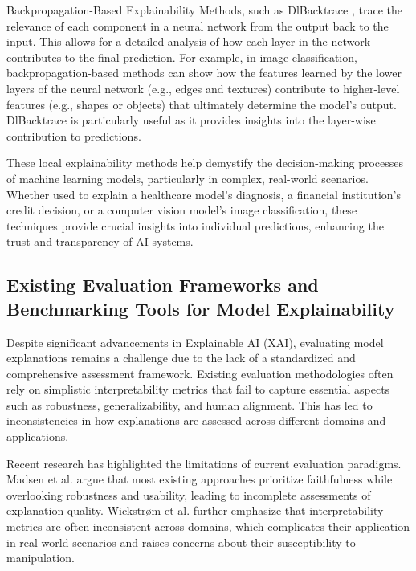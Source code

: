 Backpropagation-Based Explainability Methods, such as DlBacktrace \cite{sankarapu2024DlBacktracemodelagnosticexplainability}, trace the relevance of each component in a neural network from the output back to the input. This allows for a detailed analysis of how each layer in the network contributes to the final prediction. For example, in image classification, backpropagation-based methods can show how the features learned by the lower layers of the neural network (e.g., edges and textures) contribute to higher-level features (e.g., shapes or objects) that ultimately determine the model’s output. DlBacktrace is particularly useful as it provides insights into the layer-wise contribution to predictions.

These local explainability methods help demystify the decision-making processes of machine learning models, particularly in complex, real-world scenarios. Whether used to explain a healthcare model's diagnosis, a financial institution's credit decision, or a computer vision model's image classification, these techniques provide crucial insights into individual predictions, enhancing the trust and transparency of AI systems.

\subsection{Existing Evaluation Frameworks and Benchmarking Tools for Model Explainability}
Despite significant advancements in Explainable AI (XAI), evaluating model explanations remains a challenge due to the lack of a standardized and comprehensive assessment framework. Existing evaluation methodologies often rely on simplistic interpretability metrics that fail to capture essential aspects such as robustness, generalizability, and human alignment. This has led to inconsistencies in how explanations are assessed across different domains and applications.  

Recent research has highlighted the limitations of current evaluation paradigms. Madsen et al. \cite{madsen2024interpretabilityneedsnewparadigm} argue that most existing approaches prioritize faithfulness while overlooking robustness and usability, leading to incomplete assessments of explanation quality. Wickstrøm et al. \cite{wickstrøm2024flexibilitymanipulationslipperyslope} further emphasize that interpretability metrics are often inconsistent across domains, which complicates their application in real-world scenarios and raises concerns about their susceptibility to manipulation.  

